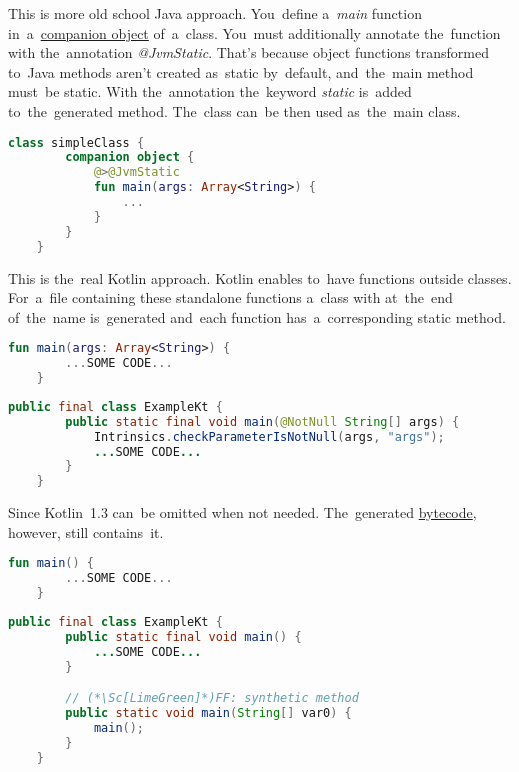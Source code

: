 This is more old school Java approach.
You~define a~\textit{main} function in~a~\hyperref[companionobject]{companion object} of~a~class.
You~must additionally annotate the~function with the~annotation \textit{@JvmStatic}.
That's because object functions transformed to~Java methods aren't created as~static by~default, and~the~main method must~be static.
With the~annotation the~keyword \textit{static} is~added to~the~generated method.
The~class can~be then used as~the~main class.

\begin{lstlisting}[language=Kotlin,title={Main function in~a~companion object}]
    class simpleClass {
        companion object {
            @>@JvmStatic
            fun main(args: Array<String>) {
                ...
            }
        }
    }
\end{lstlisting}

This is the~real Kotlin approach.
Kotlin enables to~have functions outside classes.
For~a~file containing these standalone functions a~class with  at~the~end of~the~name is~generated and~each function has~a~corresponding static method.

\begin{lstlisting}[language=Kotlin,title={A~tandalone main function in a~file \textit{Example.kt}}]
    fun main(args: Array<String>) {
        ...SOME CODE...
    }
\end{lstlisting}

\begin{lstlisting}[language=Java,title={Corresponding Java code}]
    public final class ExampleKt {
        public static final void main(@NotNull String[] args) {
            Intrinsics.checkParameterIsNotNull(args, "args");
            ...SOME CODE...
        }
    }
\end{lstlisting}

\noindent Since Kotlin~1.3  can~be omitted when not needed.
The~generated \hyperref[bytecode]{bytecode}, however, still contains~it.

\begin{lstlisting}[language=Kotlin,title={A~tandalone main function without \mbit{args}}]
    fun main() {
        ...SOME CODE...
    }
\end{lstlisting}

\begin{lstlisting}[language=Java,title={Corresponding Java code}]
    public final class ExampleKt {
        public static final void main() {
            ...SOME CODE...
        }

        // (*\Sc[LimeGreen]*)FF: synthetic method
        public static void main(String[] var0) {
            main();
        }
    }
\end{lstlisting}
